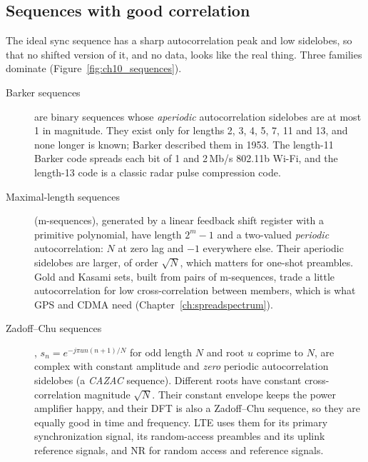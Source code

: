\subsection{Sequences with good correlation}

The ideal sync sequence has a sharp autocorrelation peak and low sidelobes, so that no shifted
version of it, and no data, looks like the real thing. Three families dominate
(Figure~\ref{fig:ch10_sequences}).
\begin{description}
\item[Barker sequences] are binary sequences whose \emph{aperiodic} autocorrelation sidelobes are at
most 1 in magnitude. They exist only for lengths 2, 3, 4, 5, 7, 11 and 13, and none longer is known;
Barker described them in 1953. The length-11 Barker code spreads each bit of 1 and 2\,Mb/s 802.11b
Wi-Fi, and the length-13 code is a classic radar pulse compression code.
\item[Maximal-length sequences] (m-sequences), generated by a linear feedback shift register with a
primitive polynomial, have length $2^m-1$ and a two-valued \emph{periodic} autocorrelation: $N$ at zero
lag and $-1$ everywhere else. Their aperiodic sidelobes are larger, of order $\sqrt N$, which matters
for one-shot preambles. Gold and Kasami sets, built from pairs of m-sequences, trade a little
autocorrelation for low cross-correlation between members, which is what GPS and CDMA need
(Chapter~\ref{ch:spreadspectrum}).
\item[Zadoff--Chu sequences], $s_n=e^{-j\pi un(n+1)/N}$ for odd length $N$ and root $u$ coprime to $N$,
are complex with constant amplitude and \emph{zero} periodic autocorrelation sidelobes (a
\emph{CAZAC} sequence). Different roots have constant cross-correlation magnitude $\sqrt N$. Their
constant envelope keeps the power amplifier happy, and their DFT is also a Zadoff--Chu sequence, so
they are equally good in time and frequency. LTE uses them for its primary synchronization signal, its
random-access preambles and its uplink reference signals, and NR for random access and reference
signals.
\end{description}


